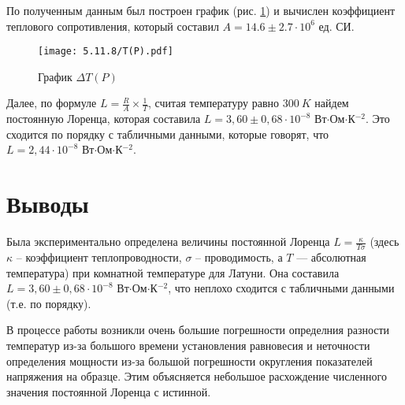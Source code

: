 \documentclass[a4paper,12pt]{article} %
\begin{document}
По полученным данным был построен график (рис. \ref{graph1}) и вычислен коэффициент теплового сопротивления, который составил $A = 14.6 \pm 2.7 \cdot 10^{6}$ ед. СИ.

\begin{figure}[H]
    \centering
    \texttt{[image: 5.11.8/T(P).pdf]}
    \caption{График $\Delta T(P)$}
    \label{graph1}
\end{figure}

Далее, по формуле $\displaystyle L = \frac{R}{A}\times\frac{1}{T}$, считая температуру равно $300 \ K$ найдем постоянную Лоренца, которая составила $L = 3,60 \pm 0,68 \cdot 10^{-8}$ Вт$\cdot$Ом$\cdot$К$^{-2}$. Это сходится по порядку с табличными данными, которые говорят, что $L = 2,44 \cdot 10^{-8}$ Вт$\cdot$Ом$\cdot$К$^{-2}$.

\section{Выводы}

Была экспериментально определена величины постоянной Лоренца $\displaystyle L=\frac{\kappa}{T\sigma}$ (здесь $\kappa$ – коэффициент теплопроводности, $\sigma$ – проводимость, а $T$ —
абсолютная температура) при комнатной температуре для Латуни. Она составила $L = 3,60 \pm 0,68 \cdot 10^{-8}$ Вт$\cdot$Ом$\cdot$К$^{-2}$, что неплохо сходится с табличными данными (т.е. по порядку).

В процессе работы возникли очень большие погрешности определния разности температур из-за большого времени установления равновесия и неточности определения мощности из-за большой погрешности округления показателей напряжения на образце. Этим объясняется небольшое расхождение численного значения постоянной Лоренца с истинной.
\end{document}
